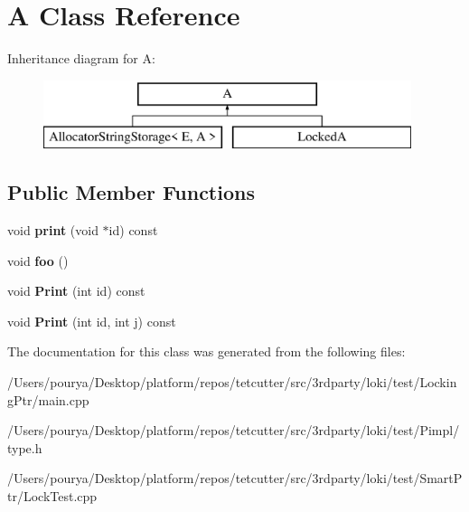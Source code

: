 \hypertarget{structA}{}\section{A Class Reference}
\label{structA}
Inheritance diagram for A\+:\begin{figure}[H]
\begin{center}
\leavevmode
\includegraphics[height=2.000000cm]{structA}
\end{center}
\end{figure}
\subsection*{Public Member Functions}
\begin{DoxyCompactItemize}
\item 
\hypertarget{structA_a21301fab7a1a95239830644368fadf5d}{}void {\bfseries print} (void $\ast$id) const \label{structA_a21301fab7a1a95239830644368fadf5d}

\item 
\hypertarget{structA_a339ab0a17662ec9e866c43112bc38ffb}{}void {\bfseries foo} ()\label{structA_a339ab0a17662ec9e866c43112bc38ffb}

\item 
\hypertarget{structA_af2fa1033a644a371b760d18021ad5e0c}{}void {\bfseries Print} (int id) const \label{structA_af2fa1033a644a371b760d18021ad5e0c}

\item 
\hypertarget{structA_ac205ae26f5d14295e65a1235dbc67801}{}void {\bfseries Print} (int id, int j) const \label{structA_ac205ae26f5d14295e65a1235dbc67801}

\end{DoxyCompactItemize}


The documentation for this class was generated from the following files\+:\begin{DoxyCompactItemize}
\item 
/\+Users/pourya/\+Desktop/platform/repos/tetcutter/src/3rdparty/loki/test/\+Locking\+Ptr/main.\+cpp\item 
/\+Users/pourya/\+Desktop/platform/repos/tetcutter/src/3rdparty/loki/test/\+Pimpl/type.\+h\item 
/\+Users/pourya/\+Desktop/platform/repos/tetcutter/src/3rdparty/loki/test/\+Smart\+Ptr/Lock\+Test.\+cpp\end{DoxyCompactItemize}
